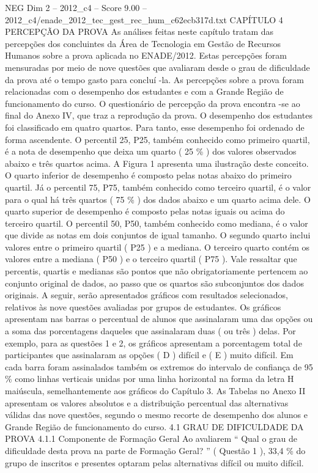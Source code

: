 \begin{textsample}{NEG Dim 2 – 2012\_c4 – Score 9.00 – 2012\_c4/enade\_2012\_tec\_gest\_rec\_hum\_c62ecb317d.txt}  \label{ex:f2_neg_328}
CAPÍTULO 4 PERCEPÇÃO DA PROVA As análises feitas neste capítulo tratam das percepções dos concluintes da Área de Tecnologia em Gestão de Recursos Humanos sobre a prova aplicada no ENADE/2012.
Estas percepções foram mensuradas por meio de nove questões que avaliaram desde o grau de dificuldade da prova até o tempo gasto para concluí -la.
As percepções sobre a prova foram relacionadas com o desempenho dos estudantes e com a Grande Região de funcionamento do curso.
O questionário de percepção da prova encontra -se ao final do Anexo IV, que traz a reprodução da prova.
O desempenho dos estudantes foi classificado em quatro quartos.
Para tanto, esse desempenho foi ordenado de forma ascendente.
O percentil 25, P25, também conhecido como primeiro quartil, é a nota de desempenho que deixa um quarto ( 25 \% ) dos valores observados abaixo e três quartos acima.
A Figura 1 apresenta uma ilustração deste conceito.
O quarto inferior de desempenho é composto pelas notas abaixo do primeiro quartil.
Já o percentil 75, P75, também conhecido como terceiro quartil, é o valor para o qual há três quartos ( 75 \% ) dos dados abaixo e um quarto acima dele.
O quarto superior de desempenho é composto pelas notas iguais ou acima do terceiro quartil.
O percentil 50, P50, também conhecido como mediana, é o valor que divide as notas em dois conjuntos de igual tamanho.
O segundo quarto inclui valores entre o primeiro quartil ( P25 ) e a mediana.
O terceiro quarto contém os valores entre a mediana ( P50 ) e o terceiro quartil ( P75 ).
Vale ressaltar que percentis, quartis e medianas são pontos que não obrigatoriamente pertencem ao conjunto original de dados, ao passo que os quartos são subconjuntos dos dados originais.
A seguir, serão apresentados gráficos com resultados selecionados, relativos às nove questões avaliadas por grupos de estudantes.
Os gráficos apresentam nas barras o percentual de alunos que assinalaram uma das opções ou a soma das porcentagens daqueles que assinalaram duas ( ou três ) delas.
Por exemplo, para as questões 1 e 2, os gráficos apresentam a porcentagem total de participantes que assinalaram as opções ( D ) difícil e ( E ) muito difícil.
Em cada barra foram assinalados também os extremos do intervalo de confiança de 95 \% como linhas verticais unidas por uma linha horizontal na forma da letra H maiúscula, semelhantemente aos gráficos do Capítulo 3.
As Tabelas no Anexo II apresentam os valores absolutos e a distribuição percentual das alternativas válidas das nove questões, segundo o mesmo recorte de desempenho dos alunos e Grande Região de funcionamento do curso. 4.1 GRAU DE DIFICULDADE DA PROVA 4.1.1 Componente de Formação Geral Ao avaliarem “ Qual o grau de dificuldade desta prova na parte de Formação Geral? ” ( Questão 1 ), 33,4 \% do grupo de inscritos e presentes optaram pelas alternativas difícil ou muito difícil.

\end{textsample}
